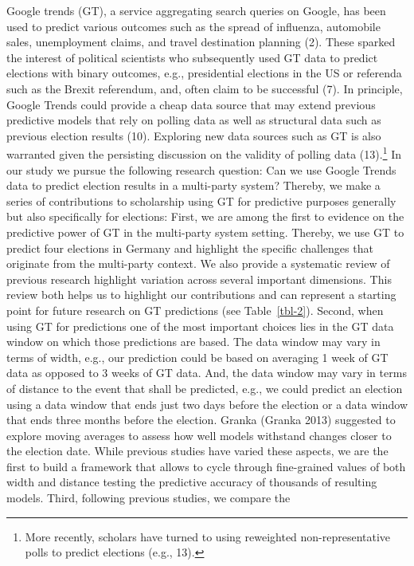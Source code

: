 \documentclass[
  letterpaper,
  DIV=11,
  numbers=noendperiod]{scrartcl}
\begin{document}
Google trends (GT), a service aggregating search queries on Google, has
been used to predict various outcomes such as the spread of influenza,
automobile sales, unemployment claims, and travel destination planning
(2). These sparked the interest of political scientists who subsequently
used GT data to predict elections with binary outcomes, e.g.,
presidential elections in the US or referenda such as the Brexit
referendum, and, often claim to be successful (7). In principle, Google
Trends could provide a cheap data source that may extend previous
predictive models that rely on polling data as well as structural data
such as previous election results (10). Exploring new data sources such
as GT is also warranted given the persisting discussion on the validity
of polling data (13).\footnote{More recently, scholars have turned to
  using reweighted non-representative polls to predict elections (e.g.,
  13).} In our study we pursue the following research question: Can we
use Google Trends data to predict election results in a multi-party
system? Thereby, we make a series of contributions to scholarship using
GT for predictive purposes generally but also specifically for
elections: First, we are among the first to evidence on the predictive
power of GT in the multi-party system setting. Thereby, we use GT to
predict four elections in Germany and highlight the specific challenges
that originate from the multi-party context. We also provide a
systematic review of previous research highlight variation across
several important dimensions. This review both helps us to highlight our
contributions and can represent a starting point for future research on
GT predictions (see Table~\ref{tbl-2}). Second, when using GT for
predictions one of the most important choices lies in the GT data window
on which those predictions are based. The data window may vary in terms
of width, e.g., our prediction could be based on averaging 1 week of GT
data as opposed to 3 weeks of GT data. And, the data window may vary in
terms of distance to the event that shall be predicted, e.g., we could
predict an election using a data window that ends just two days before
the election or a data window that ends three months before the
election. Granka (Granka 2013) suggested to explore moving averages to
assess how well models withstand changes closer to the election date.
While previous studies have varied these aspects, we are the first to
build a framework that allows to cycle through fine-grained values of
both width and distance testing the predictive accuracy of thousands of
resulting models. Third, following previous studies, we compare the
\end{document}
